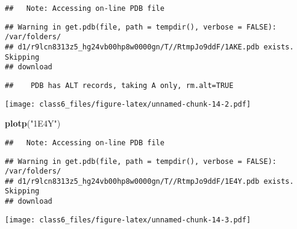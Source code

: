 \documentclass[]{article}
\newenvironment{Shaded}{\begin{snugshade}}{\end{snugshade}}
\newcommand{\KeywordTok}[1]{\textcolor[rgb]{0.13,0.29,0.53}{\textbf{#1}}}
\newcommand{\StringTok}[1]{\textcolor[rgb]{0.31,0.60,0.02}{#1}}
\newcommand{\NormalTok}[1]{#1}
\begin{document}
\begin{verbatim}
##   Note: Accessing on-line PDB file
\end{verbatim}

\begin{verbatim}
## Warning in get.pdb(file, path = tempdir(), verbose = FALSE): /var/folders/
## d1/r9lcn8313z5_hg24vb00hp8w0000gn/T//RtmpJo9ddF/1AKE.pdb exists. Skipping
## download
\end{verbatim}

\begin{verbatim}
##    PDB has ALT records, taking A only, rm.alt=TRUE
\end{verbatim}

\texttt{[image: class6\_files/figure-latex/unnamed-chunk-14-2.pdf]}

\begin{Shaded}
\begin{Highlighting}[]
\KeywordTok{plotp}\NormalTok{(}\StringTok{"1E4Y"}\NormalTok{)}
\end{Highlighting}
\end{Shaded}

\begin{verbatim}
##   Note: Accessing on-line PDB file
\end{verbatim}

\begin{verbatim}
## Warning in get.pdb(file, path = tempdir(), verbose = FALSE): /var/folders/
## d1/r9lcn8313z5_hg24vb00hp8w0000gn/T//RtmpJo9ddF/1E4Y.pdb exists. Skipping
## download
\end{verbatim}

\texttt{[image: class6\_files/figure-latex/unnamed-chunk-14-3.pdf]}
\end{document}
